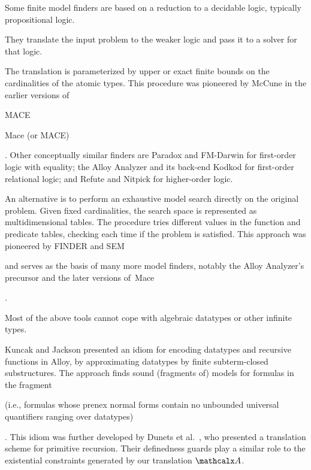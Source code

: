 
Some finite model finders are based on a reduction to a decidable logic,
typically propositional logic. \begin{longv}They translate the input problem to the weaker
logic and pass it to a solver for that logic.\end{longv}
The translation is parameterized by upper or exact finite bounds on
the cardinalities of the atomic types. This procedure was pioneered by McCune
in the earlier versions of
\begin{shortv}MACE\end{shortv}\begin{longv}Mace (or MACE)\end{longv}
\cite{mccune-1994}.
Other conceptually similar finders are Paradox \cite{claessen-sorensson-2003}
and FM-Darwin \cite{baumgartner-et-al-2009} for first-order logic with
equality; the Alloy Analyzer and its back-end Kodkod \cite{torlak-jackson-2007}
for first-order relational logic; and Refute \cite{weber-2008} and Nitpick
\cite{blanchette-nipkow-2010} for higher-order logic.

An alternative is to perform
an exhaustive model search directly on the original problem. Given fixed
cardinalities, the search space is represented as multidimensional
tables. The procedure tries different values in the function and predicate
tables, checking each time if the problem is satisfied.
This approach was pioneered by FINDER
\cite{slaney-1994} and SEM \cite{zhang-zhang-1995}\begin{longv} and serves as
the basis of many more model finders, notably the Alloy Analyzer's precursor
\cite{jackson-1996} and the later versions of~Mace
\cite{mccune-prover9-mace4}\end{longv}.

\begin{longv}
Most of the above tools cannot cope with algebraic datatypes or other infinite
types. \end{longv}%
Kuncak and Jackson \cite{kuncak-jackson-2005} presented an idiom for
encoding datatypes and recursive functions in Alloy, by approximating datatypes
by finite subterm-closed substructures. The approach finds sound (fragments
of) models for formulas in the  fragment
\begin{longv}(i.e., formulas whose prenex normal forms contain no unbounded universal
quantifiers ranging over datatypes)\end{longv}. This idiom was further developed by Dunets
et al.\ \cite{dunets-et-al-2010}, who presented a translation scheme
for primitive recursion. Their definedness guards play a similar role to the
existential constraints generated by our translation $\conv$.

